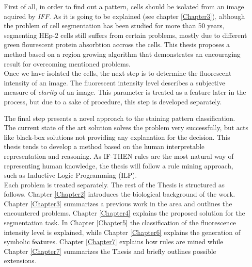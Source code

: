 First of all, in order to find out a  pattern, cells should be isolated from an image aquired by \textit{IFF}. As it is going to be explained (see chapter \ref{Chapter3}), although the problem of cell segmentation has been studied for more than 50 years, segmenting HEp-2 cells still suffers from certain problems, mostly due to different green flourescent protein absorbtion accross the cells. This thesis proposes a method based on a region growing algorithm that demonstrates an encouraging result for overcoming mentioned problems. \\

Once we have isolated the cells, the next step is to determine the fluorescent intensity of an image. The fluorescent intensity level describes a subjective measure of \textit{clarity} of an image. This parameter is treated as a feature later in the process, but due to a sake of procedure, this step is developed separately. 

The final step presents a novel approach to the staining pattern classification. The current state of the art solution solves the problem very successfully, but acts like  black-box solutions not providing any explanation for the decision. This thesis tends to develop a method based on the human interpretable representation and reasoning. As IF-THEN rules are the most natural way of representing human knowledge,  the thesis will follow a rule mining approach, such as Inductive Logic Programming (ILP). \\

Each problem is treated separately. The rest of the Thesis is structured as follows. Chapter \ref{Chapter2} introduces the biological background of the work. Chapter \ref{Chapter3} summarizes a previous work in the area and outlines the encountered problems. Chapter \ref{Chapter4} explains the proposed solution for the segmentation task. In Chapter \ref{Chapter5} the classification of the fluorescence intensity level is explained, while Chapter \ref{Chapter6} explains the generation of symbolic features. Chapter \ref{Chapter7} explains how rules are mined while Chapter \ref{Chapter7} summarizes the Thesis and briefly outlines possible extensions.